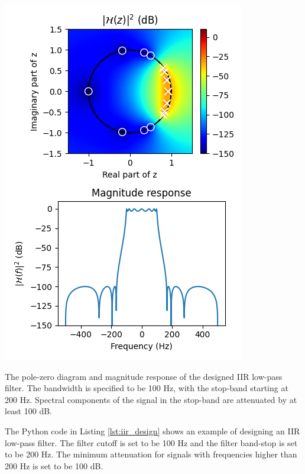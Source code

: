 \begin{marginfigure}
    \begin{center}
        \includegraphics[width=\textwidth]{code/026_iir/ex_design_lpf.png}
    \end{center}
    \caption{The pole-zero diagram and magnitude response of the designed IIR low-pass filter. The bandwidth is specified to be 100 Hz, with the stop-band starting at 200 Hz. Spectral components of the signal in the stop-band are attenuated by at least 100 dB.}
    \label{fig:iir_lpf_ex_sf}
\end{marginfigure}

The Python code in Listing \ref{lst:iir_design} shows an example of
designing an IIR low-pass filter. The filter cutoff is set to be 100
Hz and the filter band-stop is set to be 200 Hz. The minimum
attenuation for signals with frequencies higher than 200 Hz is set to
be 100 dB.

